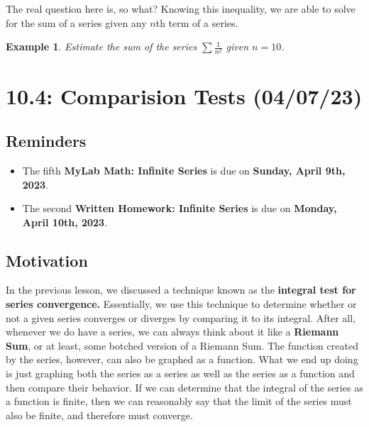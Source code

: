\documentclass{report}
\newtheorem*{remark*}{Example}
\begin{document}
\begin{sloppypar}
\begin{center}
\end{center}

The real question here is, so what? Knowing
this inequality, we are able to solve
for the sum of a series given any $ n$th
term of a series.

\begin{remark*}
  Estimate the sum of the series $ \sum \frac{1}{n^{2}}$
  given $ n = 10 $.
\end{remark*}



\chapter{10.4: Comparision Tests (04/07/23)}
\section{Reminders}

\begin{itemize}
  \item The fifth \textbf{MyLab Math: Infinite Series} is due on
        \textbf{Sunday, April 9th, 2023}.
  \item The second \textbf{Written Homework: Infinite Series} is due on
        \textbf{Monday, April 10th, 2023}.
\end{itemize}

\section{Motivation}
In the previous lesson, we discussed a technique known as the
\textbf{integral test for series convergence.} Essentially,
we use this technique to determine whether or not a given series
converges or diverges by comparing it to its integral. After all,
whenever we do have a series, we can always think about it like
a \textbf{Riemann Sum}, or at least, some botched version of a
Riemann Sum. The function created by the series, however, can
also be graphed as a function. What we end up doing is just
graphing both the series as a series as well as the series as a
function and then compare their behavior. If we can determine
that the integral of the series as a function is finite,
then we can reasonably say that the limit of the series must
also be finite, and therefore must converge.


\end{sloppypar}
\end{document}
